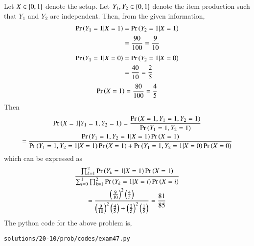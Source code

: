 Let $X \in \left\{0,1\right\}$ denote the setup.  Let $Y_1,Y_2 \in \left\{0,1\right\}$ denote the item production such that $Y_1$ and $Y_2$ are independent.  Then, from the given information,
\begin{align}
\Pr\left(Y_1=1|X = 1\right) &=\Pr\left(Y_2=1|X = 1\right) 
\\
&= \frac{90}{100} = \frac{9}{10}
\end{align}
\begin{align}
\Pr\left(Y_1=1|X = 0\right)&=\Pr\left(Y_2=1|X = 0\right) 
\\
&= \frac{40}{10} = \frac{2}{5}
\end{align}
\begin{align}
\Pr\left(X = 1\right) = \frac{80}{100} = \frac{4}{5}
\end{align}
Then
{\tiny
\begin{multline}
\Pr\left(X=1|Y_1=1, Y_2=1\right) = \frac{\Pr\left(X=1,Y_1=1, Y_2=1\right)}{\Pr\left(Y_1=1, Y_2=1\right)}
\\
= \frac{\Pr\left(Y_1=1, Y_2=1|X=1\right)\Pr\left(X=1\right)}{\Pr\left(Y_1=1, Y_2=1|X=1\right)\Pr\left(X=1\right)+\Pr\left(Y_1=1, Y_2=1|X=0\right)\Pr\left(X=0\right)}
\end{multline}
}
which can be expressed as
\begin{multline}
 \frac{\prod_{k=1}^{2}\Pr\left(Y_k=1|X=1\right)\Pr\left(X=1\right)}{\sum_{i=0}^{1}\prod_{k=1}^{2}\Pr\left(Y_k=1|X=i\right)\Pr\left(X=i\right)}
\\
= \frac{\left(\frac{9}{10}\right)^2\left(\frac{4}{5}\right)}{\left(\frac{9}{10}\right)^2\left(\frac{4}{5}\right)+\left(\frac{2}{5}\right)^2\left(\frac{1}{5}\right)} = \frac{81}{85}
\end{multline}
The python code for the above problem is,
\begin{lstlisting}
solutions/20-10/prob/codes/exam47.py
\end{lstlisting}

